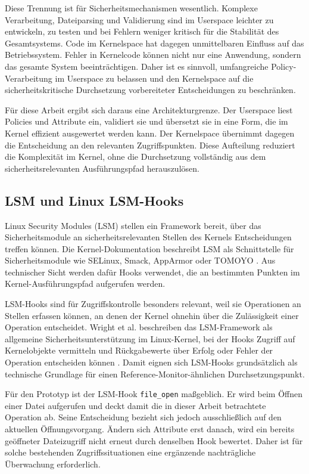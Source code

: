 Diese Trennung ist für Sicherheitsmechanismen wesentlich. 
Komplexe Verarbeitung, Dateiparsing und Validierung sind im Userspace leichter zu entwickeln, zu testen und bei Fehlern weniger kritisch für die Stabilität des Gesamtsystems. 
Code im Kernelspace hat dagegen unmittelbaren Einfluss auf das Betriebssystem. 
Fehler in Kernelcode können nicht nur eine Anwendung, sondern das gesamte System beeinträchtigen. 
Daher ist es sinnvoll, umfangreiche Policy-Verarbeitung im Userspace zu belassen und den Kernelspace auf die sicherheitskritische Durchsetzung vorbereiteter Entscheidungen zu beschränken.

Für diese Arbeit ergibt sich daraus eine Architekturgrenze. 
Der Userspace liest Policies und Attribute ein, validiert sie und übersetzt sie in eine Form, die im Kernel effizient ausgewertet werden kann. 
Der Kernelspace übernimmt dagegen die Entscheidung an den relevanten Zugriffspunkten. 
Diese Aufteilung reduziert die Komplexität im Kernel, ohne die Durchsetzung vollständig aus dem sicherheitsrelevanten Ausführungspfad herauszulösen.

\subsection{LSM und Linux LSM-Hooks}
Linux Security Modules (LSM) stellen ein Framework bereit, über das Sicherheitsmodule an sicherheitsrelevanten Stellen des Kernels Entscheidungen treffen können.
Die Kernel-Dokumentation beschreibt LSM als Schnittstelle für Sicherheitsmodule wie SELinux, Smack, AppArmor oder TOMOYO \citep{kernelorgLSM}. 
Aus technischer Sicht werden dafür Hooks verwendet, die an bestimmten Punkten im Kernel-Ausführungspfad aufgerufen werden.

LSM-Hooks sind für Zugriffskontrolle besonders relevant, weil sie Operationen an Stellen erfassen können, an denen der Kernel ohnehin über die Zulässigkeit einer Operation entscheidet. 
Wright et al. beschreiben das LSM-Framework als allgemeine Sicherheitsunterstützung im Linux-Kernel, bei der Hooks Zugriff auf Kernelobjekte vermitteln und Rückgabewerte über Erfolg oder Fehler der Operation entscheiden können \citep{wright2002linux}. 
Damit eignen sich LSM-Hooks grundsätzlich als technische Grundlage für einen Reference-Monitor-ähnlichen Durchsetzungspunkt.

Für den Prototyp ist der LSM-Hook \texttt{file\_open} maßgeblich. Er wird beim Öffnen einer Datei aufgerufen und deckt damit die in dieser Arbeit betrachtete Operation ab. Seine Entscheidung bezieht sich jedoch ausschließlich auf den aktuellen Öffnungsvorgang. Ändern sich Attribute erst danach, wird ein bereits geöffneter Dateizugriff nicht erneut durch denselben Hook bewertet. Daher ist für solche bestehenden Zugriffssituationen eine ergänzende nachträgliche Überwachung erforderlich.

